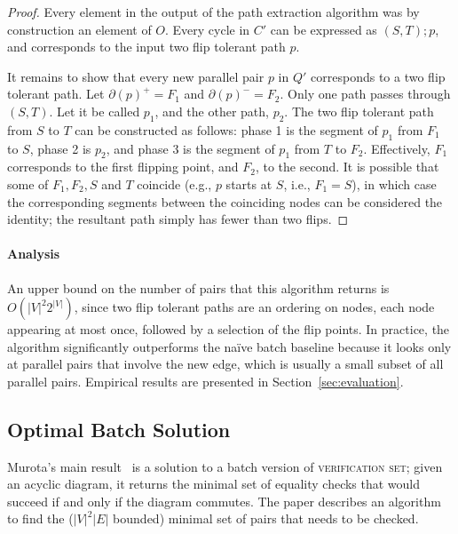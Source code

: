 \documentclass[sigplan,review]{acmart}
\begin{document}
\begin{proof}
    Every element in the output of the path extraction algorithm was by construction an element of $O$. Every cycle in $C'$ can be expressed as $(S, T) ; p$, and corresponds to the input two flip tolerant path $p$.
    
    It remains to show that every new parallel pair $p$ in $Q'$ corresponds to a two flip tolerant path.
    Let $\partial(p)^+ = F_1$ and $\partial(p)^- = F_2$. 
    Only one path passes through $(S, T)$. Let it be called $p_1$, and the other path, $p_2$.
    The two flip tolerant path from $S$ to $T$ can be constructed as follows: phase 1 is the segment of $p_1$ from $F_1$ to $S$, phase 2 is $p_2$, and phase 3 is the segment of $p_1$ from $T$ to $F_2$.
    Effectively, $F_1$ corresponds to the first flipping point, and $F_2$, to the second.
    It is possible that some of $F_1, F_2, S$ and $T$ coincide (e.g., $p$ starts at $S$, i.e., $F_1 = S$), in which case the corresponding segments between the coinciding nodes can be considered the identity; the resultant path simply has fewer than two flips.
\end{proof}

\paragraph{Analysis}
An upper bound on the number of pairs that this algorithm returns is $O(|V|^{2} 2^{|V|})$, since two flip tolerant paths are an ordering on nodes, each node appearing at most once, followed by a selection of the flip points.
In practice, the algorithm significantly outperforms the na\"{i}ve batch baseline because it looks only at parallel pairs that involve the new edge, which is usually a small subset of all parallel pairs.
Empirical results are presented in Section~\ref{sec:evaluation}.

\subsection{Optimal Batch Solution}

\label{sec:batchBaseline}

Murota's main result~\cite{commutative} is a solution to a batch version of \textsc{verification set}; given an acyclic diagram, it returns the minimal set of equality checks that would succeed if and only if the diagram commutes.
The paper describes an algorithm to find the ($|V|^2|E|$ bounded) minimal set of pairs that needs to be checked.
\end{document}
